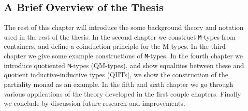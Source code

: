 \documentclass[twoside,11pt,openright]{report}
\theoremstyle{plain} %
\theoremstyle{definition}
\theoremstyle{remark}
\begin{document}
\subsection{A Brief Overview of the Thesis}
The rest of this chapter will introduce the some background theory and notation used in the rest of the thesis. In the second chapter we construct \texttt{M}-types from containers, and define a coinduction principle for the M-types. In the third chapter we give some example constructions of \texttt{M}-types. In the fourth chapter we introduce quotiented \texttt{M}-types (QM-types), and show equalities between these and quotient inductive-inductive types (QIITs), we show the construction of the partiality monad as an example. In the fifth and sixth chapter we go through various applications of the theory developed in the first couple chapters. Finally we conclude by discussion future research and improvements.
\end{document}
